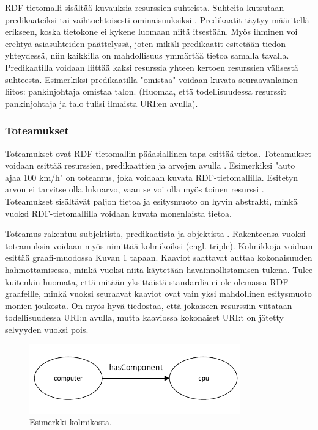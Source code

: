 \documentclass[finnish, 12pt, a4paper, elec, utf8, pdfa, online]{aaltothesis}
\begin{document}
RDF-tietomalli sisältää kuvauksia resurssien suhteista. Suhteita kutsutaan predikaateiksi tai vaihtoehtoisesti ominaisuuksiksi \cite{Antoniou}. Predikaatit täytyy määritellä erikseen, koska tietokone ei kykene luomaan niitä itsestään. Myös ihminen voi erehtyä asiasuhteiden päättelyssä, joten mikäli predikaatit esitetään tiedon yhteydessä, niin kaikkilla on mahdollisuus ymmärtää tietoa samalla tavalla. Predikaatilla voidaan liittää kaksi resurssia yhteen kertoen resurssien välisestä suhteesta. Esimerkiksi predikaatilla "omistaa" voidaan kuvata seuraavanlainen liitos: pankinjohtaja omistaa talon. (Huomaa, että todellisuudessa resurssit pankinjohtaja ja talo tulisi ilmaista URI:en avulla).

\subsubsection{Toteamukset}

Toteamukset ovat RDF-tietomallin pääasiallinen tapa esittää tietoa. Toteamukset voidaan esittää resurssien, predikaattien ja arvojen avulla \cite{Antoniou}. Esimerkiksi "auto ajaa 100 km/h" on toteamus, joka voidaan kuvata RDF-tietomallilla. Esitetyn arvon ei tarvitse olla lukuarvo, vaan se voi olla myös toinen resurssi \cite{Antoniou}\cite{IEEE_XML}. Toteamukset sisältävät paljon tietoa ja esitysmuoto on hyvin abstrakti, minkä vuoksi RDF-tietomallilla voidaan kuvata monenlaista tietoa.

Toteamus rakentuu subjektista, predikaatista ja objektista \cite{lassila_dissertion}. Rakenteensa vuoksi toteamuksia voidaan myös nimittää kolmikoiksi (engl. triple). Kolmikkoja voidaan esittää graafi-muodossa Kuvan 1 tapaan. Kaaviot saattavat auttaa kokonaisuuden hahmottamisessa, minkä vuoksi niitä käytetään havainnollistamisen tukena. Tulee kuitenkin huomata, että mitään yksittäistä standardia ei ole olemassa RDF-graafeille, minkä vuoksi seuraavat kaaviot ovat vain yksi mahdollinen esitysmuoto monien joukosta. On myös hyvä tiedostaa, että jokaiseen resurssiin viitataan todellisuudessa URI:n avulla, mutta kaaviossa kokonaiset URI:t on jätetty selvyyden vuoksi pois.

\begin{figure}[htb]
\centering
\includegraphics[height=3cm]{images/RDF-triplet.pdf}
\caption{Esimerkki kolmikosta. \label{images/RDF-triplet1}}
\end{figure}
\end{document}
